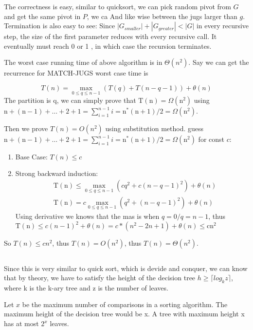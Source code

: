 \documentclass[a4paper]{article}
\begin{document}
The correctness is easy, similar to quicksort, we can pick random pivot from $G$ and get the same pivot in $P$, we ca
 And like wise between the jugs larger than $g$. Termination is also easy to see: Since $\left|G_{smaller}\right|+\left|G_{greater}\right|<|G|$ in every recursive step, the size of the first parameter reduces with every recursive call. It eventually must reach 0 or 1 , in which case the recursion terminates.

 The worst case running time of above algorithm is in $\Theta(n^2)$. Say we can get the recurrence for MATCH-JUGS worst case time is 

 $$T(n)=\max _{0 \leq q \leq n-1}(T(q)+T(n-q-1))+\theta(n)$$ The partition is q, we can simply prove that $\mathrm{T}(\mathrm{n})=\Omega\left(\mathrm{n}^2\right)$ using $\mathrm{n}+(\mathrm{n}-1)+\ldots+2+1=\sum_{i=1}^{n-1} i=\mathrm{n}^*(\mathrm{n}+1) / 2=\Omega\left(\mathrm{n}^2\right)$.
 
 Then we prove $T(n)=O(n^2)$ using substitution method. guess $\mathrm{n}+(\mathrm{n}-1)+\ldots+2+1=\sum_{i=1}^{n-1} i=\mathrm{n}^*(\mathrm{n}+1) / 2=\Omega\left(\mathrm{n}^2\right) $ for const $c$:

 \begin{enumerate}
  \item Base Case: $T(n)\leq c$
  \item Strong backward induction: $$\begin{aligned}
    & \mathrm{T}(\mathrm{n}) \leq \max _{0 \leq q \leq n-1}\left(c q^2+c(n-q-1)^2\right)+\theta(n) \\
    & \mathrm{T}(\mathrm{n})=c \max _{0 \leq q \leq n-1}\left(q^2+(n-q-1)^2\right)+\theta(n)
    \end{aligned}$$
    Using derivative we knows that the mas is when $q=0/q=n-1$, thus $ \mathrm{T}(\mathrm{n}) \leq c(n-1)^2+\theta(n)=c *\left(n^2-2 n+1\right)+\theta(n) \leq \mathrm{cn}^2$
 \end{enumerate}
So $T(n)\leq cn^2$, thus $T(n)=O(n^2)$, thus $T(n)=\Theta(n^2)$.
\subsection{}
Since this is very similar to quick sort, which is devide and conquer, we can know that by theory, we have to satisfy the height of the decision tree $h\geq\lceil log_kz\rceil$, where k is the k-ary tree and z is the number of leaves. 

Let $x$ be the maximum number of comparisons in a sorting algorithm. The maximum height of the decision tree would be x. A tree with maximum height x has at most $2^x$ leaves.
\end{document}
